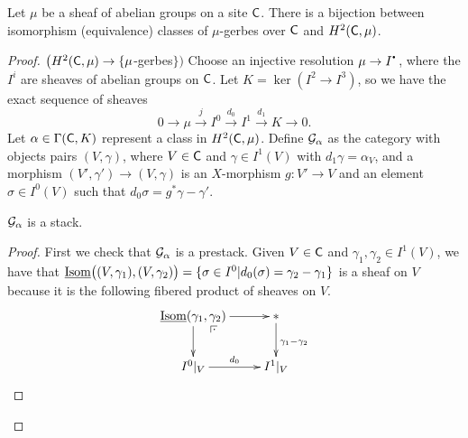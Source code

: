 \begin{theorem}
 Let $\mu$ be a sheaf of abelian groups on a site $\text{\sf C}$. There is a bijection between isomorphism (equivalence) classes of $\mu$-gerbes over $\text{\sf C}$ and $H^2(\text{\sf C},\mu)$.
\end{theorem}
\begin{proof}
 $\bigl(H^2(\text{\sf C},\mu)\to \{\mu$-gerbes$\}\bigr)$ Choose an injective resolution $\mu\to I^\udot$, where the $I^i$ are sheaves of abelian groups on $\text{\sf C}$. Let $K=\ker(I^2\to I^3)$, so we have the exact sequence of sheaves
 \[
  0\to \mu \xrightarrow j I^0\xrightarrow{d_0} I^1\xrightarrow{d_1} K\to 0.
 \]
 Let $\alpha\in \Gamma(\text{\sf C},K)$ represent a class in $H^2(\text{\sf C},\mu)$. Define $\mathcal{G}_\alpha$ as the category with objects pairs $(V,\gamma)$, where $V\in \text{\sf C}$ and $\gamma\in I^1(V)$ with $d_1\gamma=\alpha_V$, and a morphism $(V',\gamma')\to (V,\gamma)$ is an $X$-morphism $g:V'\to V$ and an element $\sigma\in I^0(V)$ such that $d_0\sigma=g^*\gamma-\gamma'$.
 \begin{claim}
   $\mathcal{G}_\alpha$ is a stack.
 \end{claim}
 \begin{proof}
  First we check that $\mathcal{G}_\alpha$ is a prestack. Given $V\in \text{\sf C}$ and $\gamma_1,\gamma_2\in I^1(V)$, we have that $\operatorname{\underline{Isom}}\bigl((V,\gamma_1),(V,\gamma_2)\bigr)=\{\sigma\in I^0|d_0(\sigma)=\gamma_2-\gamma_1\}$ is a sheaf on $V$ because it is the following fibered product of sheaves on $V$.
  \[\xymatrix{
   \isom(\gamma_1,\gamma_2) \ar[d]\ar[r]\ar@{}[dr]|(.25)\pb & \ast\ar[d]^{\gamma_1-\gamma_2}\\
   I^0|_V\ar[r]^{d_0} & I^1|_V
  }\]


\end{proof}
\end{proof}
